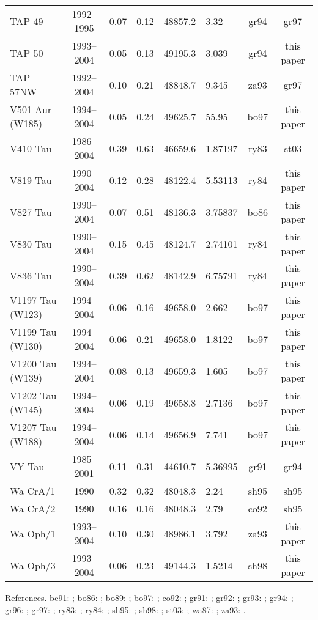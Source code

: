 \begin{table}
{\begin{tabular}{lcclclcc}
         TAP 49 &  1992--1995 & 0.07 & 0.12 & 48857.2 &  3.32    & gr94 & gr97 \\
         TAP 50 &  1993--2004 & 0.05 & 0.13 & 49195.3 &  3.039   & gr94 & this paper \\
       TAP 57NW &  1992--2004 & 0.10 & 0.21 & 48848.7 &  9.345   & za93 & gr97 \\
V501 Aur  (W185)&  1994--2004 & 0.05 & 0.24 & 49625.7 & 55.95    & bo97 & this paper \\
       V410 Tau &  1986--2004 & 0.39 & 0.63 & 46659.6 &  1.87197 & ry83 & st03 \\
       V819 Tau &  1990--2004 & 0.12 & 0.28 & 48122.4 &  5.53113 & ry84 & this paper \\
       V827 Tau &  1990--2004 & 0.07 & 0.51 & 48136.3 &  3.75837 & bo86 & this paper \\
       V830 Tau &  1990--2004 & 0.15 & 0.45 & 48124.7 &  2.74101 & ry84 & this paper \\
       V836 Tau &  1990--2004 & 0.39 & 0.62 & 48142.9 &  6.75791 & ry84 & this paper \\
V1197 Tau (W123)&  1994--2004 & 0.06 & 0.16 & 49658.0 &  2.662   & bo97 & this paper \\
V1199 Tau (W130)&  1994--2004 & 0.06 & 0.21 & 49658.0 &  1.8122  & bo97 & this paper\\
V1200 Tau (W139)&  1994--2004 & 0.08 & 0.13 & 49659.3 &  1.605   & bo97 & this paper \\
V1202 Tau (W145)&  1994--2004 & 0.06 & 0.19 & 49658.8 &  2.7136  & bo97 & this paper\\
V1207 Tau (W188)&  1994--2004 & 0.06 & 0.14 & 49656.9 &  7.741   & bo97 & this paper\\
         VY Tau &  1985--2001 & 0.11 & 0.31 & 44610.7 &  5.36995 & gr91 & gr94 \\
       Wa CrA/1 &  1990      & 0.32 & 0.32 & 48048.3 &  2.24    & sh95 & sh95 \\
       Wa CrA/2 &  1990      & 0.16 & 0.16 & 48048.3 &  2.79    & co92 & sh95 \\
       Wa Oph/1 &  1993--2004 & 0.10 & 0.30 & 48986.1 &  3.792   & za93 & this paper \\
       Wa Oph/3 &  1993--2004 & 0.06 & 0.23 & 49144.3 &  1.5214  & sh98 & this paper \\
\hline
\end{tabular}}
\medskip
References. 
be91: \citet{berdnik91}; bo86: \citet{bouvier86}; bo89: \citet{bouvier89}; bo97:
\citet{bouvier97}; co92: \citet{covino92}; gr91: \citet{grankin91}; gr92: \citet{grankin92}; gr93:
\citet{grankin93}; gr94: \citet{grankin94}; gr96: \citet{grankin96}; gr97: \citet{grankin97}; ry83: \citet{rydgren83}; ry84: \citet{rydgren84}; sh95: \citet{shevchenko95}; sh98: \citet{shevchenko98}; st03: \citet{stelzer03}; wa87: \citet{walter87};  za93: \citet{zakirov93}. 
\end{table}